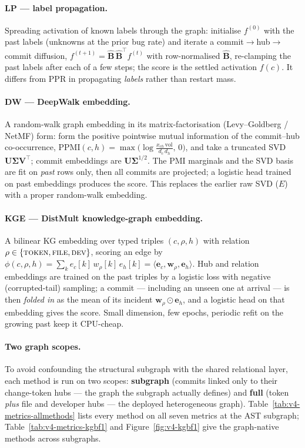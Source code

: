\documentclass[11pt,a4paper]{article}
\begin{document}
	\paragraph{LP --- label propagation.} Spreading activation of known labels through
	the graph: initialise $f^{(0)}$ with the past labels (unknowns at the prior bug
	rate) and iterate a commit$\to$hub$\to$commit diffusion,
	$f^{(t+1)}=\widehat{\mathbf{B}}\,\widehat{\mathbf{B}}^{\!\top}f^{(t)}$ with
	row-normalised $\widehat{\mathbf{B}}$, re-clamping the past labels after each of a
	few steps; the score is the settled activation $f(c)$. It differs from PPR in
	propagating \emph{labels} rather than restart mass.

	\paragraph{DW --- DeepWalk embedding.} A random-walk graph embedding in its
	matrix-factorisation (Levy--Goldberg / NetMF) form: form the positive pointwise
	mutual information of the commit--hub co-occurrence,
	$\mathrm{PPMI}(c,h)=\max\!\big(\log\frac{x_{ch}\,\mathrm{vol}}{d_c\,d_h},\,0\big)$,
	and take a truncated SVD $\mathbf{U}\boldsymbol{\Sigma}\mathbf{V}^{\!\top}$; commit
	embeddings are $\mathbf{U}\boldsymbol{\Sigma}^{1/2}$. The PMI marginals and the SVD
	basis are fit on \emph{past} rows only, then all commits are projected; a logistic
	head trained on past embeddings produces the score. This replaces the earlier raw
	SVD ($E$) with a proper random-walk embedding.

	\paragraph{KGE --- DistMult knowledge-graph embedding.} A bilinear KG embedding
	over typed triples $(c,\rho,h)$ with relation $\rho\in\{\textsc{token},
	\textsc{file},\textsc{dev}\}$, scoring an edge by
	$\phi(c,\rho,h)=\sum_k e_c[k]\,w_\rho[k]\,e_h[k]=\langle\mathbf{e}_c,\mathbf{w}_\rho,\mathbf{e}_h\rangle$.
	Hub and relation embeddings are trained on the past triples by a logistic loss
	with negative (corrupted-tail) sampling; a commit --- including an unseen one at
	arrival --- is then \emph{folded in} as the mean of its incident
	$\mathbf{w}_\rho\!\odot\!\mathbf{e}_h$, and a logistic head on that embedding gives
	the score. Small dimension, few epochs, periodic refit on the growing past keep it
	CPU-cheap.

	\paragraph{Two graph scopes.} To avoid confounding the structural subgraph with
	the shared relational layer, each method is run on two scopes: \textbf{subgraph}
	(commits linked only to their change-token hubs --- the graph the subgraph
	actually defines) and \textbf{full} (token \emph{plus} file and developer hubs
	--- the deployed heterogeneous graph). Table~\ref{tab:v4-metrics-allmethods}
	lists every method on all seven metrics at the AST subgraph;
	Table~\ref{tab:v4-metrics-kgbf1} and Figure~\ref{fig:v4-kgbf1} give the
	graph-native methods across subgraphs.
\end{document}
